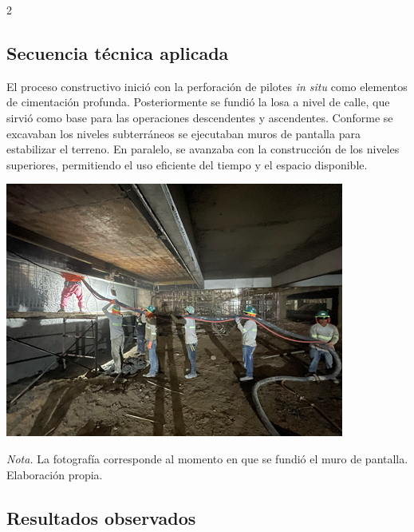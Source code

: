 \documentclass[12pt,spanish,Letterpaper,openany]{book}
\begin{document}
\begin {multicols}{2}
\hypertarget{secuencia-tuxe9cnica-aplicada}{%
\subsection{Secuencia técnica aplicada}\label{secuencia-tuxe9cnica-aplicada}}

El proceso constructivo inició con la perforación de pilotes \emph{in situ} como elementos de cimentación profunda. Posteriormente se fundió la losa a nivel de calle, que sirvió como base para las operaciones descendentes y ascendentes. Conforme se excavaban los niveles subterráneos se ejecutaban muros de pantalla para estabilizar el terreno. En paralelo, se avanzaba con la construcción de los niveles superiores, permitiendo el uso eficiente del tiempo y el espacio disponible.

\begin {flushleft}
\noindent\begin{minipage}[c]{\columnwidth}

\textbf{}

\begin{center}\includegraphics[width=0.8\linewidth]{imagenes_articulos/art02_03} \end{center}

\emph{Nota.} La fotografía corresponde al momento en que se fundió el muro de pantalla. Elaboración propia.

\end{minipage}
\end {flushleft}

\hypertarget{resultados-observados}{%
\subsection{Resultados observados}\label{resultados-observados}}


\end{multicols}
\end{document}
